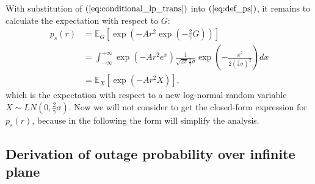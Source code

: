 With substitution of $(\ref{eq:conditional_lp_trans})$ into $(\ref{eq:def_ps})$, it remains to calculate the expectation with respect to $G$:
\begin{align}
\label{eq:def_ps_2}
p_{s}(r) &= \mathbb{E}_{G}\left[ \exp(-A r^2 \exp(-\frac{2}{\gamma}G)) \right] \nonumber\\
&=\int_{-\infty}^{+\infty} \exp(-A r^2 e^{x})\frac{1}{\sqrt{2\pi}\frac{2}{\gamma}\sigma} \exp(-\frac{x^2}{2(\frac{2}{\gamma}\sigma)^2}) dx \nonumber\\
&=\mathbb{E}_{X}\left[ \exp(-Ar^2X)\right], 
\end{align}
which is the expectation with respect to a new log-normal random variable $X \sim LN(0, \frac{2}{\gamma}\sigma)$.
Now we will not consider to get the closed-form expression for $p_{s}(r)$, because in the following the form will simplify the analysis. 
\subsection{Derivation of outage probability over infinite plane}
